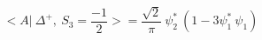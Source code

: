 \begin{equation}
<A|~\Delta^{+},~ S_3=\frac{-1}{2} >= \frac{\sqrt{2}}{\pi} ~\psi_2^*~(1-3\psi_1^*~\psi_1)
\end{equation}

